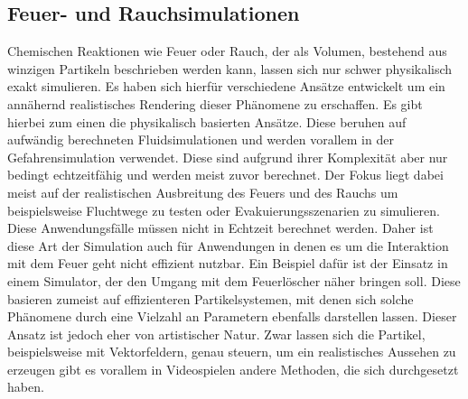 \subsection{Feuer- und Rauchsimulationen}
Chemischen Reaktionen wie Feuer oder Rauch, der als Volumen, bestehend aus winzigen Partikeln beschrieben werden kann, 
lassen sich nur schwer physikalisch exakt simulieren. Es haben sich hierfür verschiedene Ansätze entwickelt um ein
annähernd realistisches Rendering dieser Phänomene zu erschaffen. Es gibt hierbei zum einen die physikalisch basierten Ansätze. 
Diese beruhen auf aufwändig berechneten Fluidsimulationen und werden vorallem in der Gefahrensimulation verwendet.
Diese sind aufgrund ihrer Komplexität aber nur bedingt echtzeitfähig und werden meist zuvor berechnet. 
Der Fokus liegt dabei meist auf der realistischen Ausbreitung des Feuers und des Rauchs um beispielsweise Fluchtwege 
zu testen oder Evakuierungsszenarien zu simulieren. Diese Anwendungsfälle müssen nicht in Echtzeit berechnet werden.
Daher ist diese Art der Simulation auch für Anwendungen in denen es um die Interaktion mit dem Feuer geht nicht 
effizient nutzbar. Ein Beispiel dafür ist der Einsatz in einem Simulator, der den Umgang mit dem Feuerlöscher
näher bringen soll. Diese basieren zumeist auf effizienteren Partikelsystemen, mit denen sich solche Phänomene 
durch eine Vielzahl an Parametern ebenfalls darstellen lassen. Dieser Ansatz ist jedoch eher von artistischer Natur. 
Zwar lassen sich die Partikel, beispielsweise mit Vektorfeldern, genau steuern, um ein realistisches Aussehen zu 
erzeugen gibt es vorallem in Videospielen andere Methoden, die sich durchgesetzt haben. 


